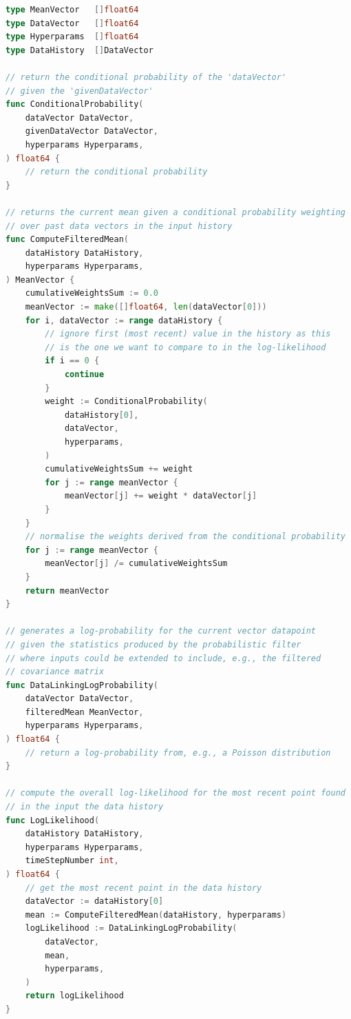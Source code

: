 \begin{lstlisting}[language=Go]
type MeanVector   []float64
type DataVector   []float64
type Hyperparams  []float64
type DataHistory  []DataVector

// return the conditional probability of the 'dataVector' 
// given the 'givenDataVector'
func ConditionalProbability(
    dataVector DataVector, 
    givenDataVector DataVector,
    hyperparams Hyperparams,
) float64 {
    // return the conditional probability
}

// returns the current mean given a conditional probability weighting
// over past data vectors in the input history
func ComputeFilteredMean(
    dataHistory DataHistory, 
    hyperparams Hyperparams,
) MeanVector {
    cumulativeWeightsSum := 0.0
    meanVector := make([]float64, len(dataVector[0]))
    for i, dataVector := range dataHistory {
        // ignore first (most recent) value in the history as this 
        // is the one we want to compare to in the log-likelihood
        if i == 0 {
            continue
        }
        weight := ConditionalProbability(
            dataHistory[0], 
            dataVector, 
            hyperparams,
        )
        cumulativeWeightsSum += weight
        for j := range meanVector {
            meanVector[j] += weight * dataVector[j] 
        } 
    }
    // normalise the weights derived from the conditional probability
    for j := range meanVector {
        meanVector[j] /= cumulativeWeightsSum 
    }
    return meanVector 
}

// generates a log-probability for the current vector datapoint
// given the statistics produced by the probabilistic filter
// where inputs could be extended to include, e.g., the filtered
// covariance matrix
func DataLinkingLogProbability(
    dataVector DataVector, 
    filteredMean MeanVector,
    hyperparams Hyperparams,
) float64 {
    // return a log-probability from, e.g., a Poisson distribution
}

// compute the overall log-likelihood for the most recent point found
// in the input the data history
func LogLikelihood(
    dataHistory DataHistory, 
    hyperparams Hyperparams,
    timeStepNumber int,
) float64 {
    // get the most recent point in the data history
    dataVector := dataHistory[0]
    mean := ComputeFilteredMean(dataHistory, hyperparams)
    logLikelihood := DataLinkingLogProbability(
        dataVector, 
        mean, 
        hyperparams,
    )
    return logLikelihood
}
\end{lstlisting}

